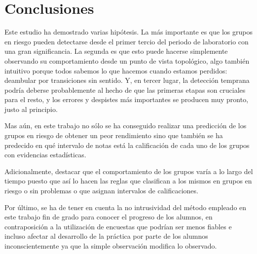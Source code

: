 \chapter{Conclusiones}\label{sec:chapterXIV}

Este estudio ha demostrado varias hipótesis. La más importante es que los grupos en riesgo pueden detectarse desde el primer tercio del periodo de laboratorio con una gran significancia. La segunda es que esto puede hacerse simplemente observando su comportamiento desde un punto de vista topológico, algo también intuitivo porque todos sabemos lo que hacemos cuando estamos perdidos: deambular por transiciones sin sentido. Y, en tercer lugar, la detección temprana podría deberse probablemente al hecho de que las primeras etapas son cruciales para el resto, y los errores y despistes más importantes se producen muy pronto, justo al principio.

Mas aún, en este trabajo no sólo se ha conseguido realizar una predicción de los grupos en riesgo de obtener un peor rendimiento sino que también se ha predecido en qué intervalo de notas está la calificación de cada uno de los grupos con evidencias estadísticas.

Adicionalmente, destacar que el comportamiento de los grupos varía a lo largo del tiempo puesto que así lo hacen las reglas que clasifican a los mismos en grupos en riesgo o sin problemas o que asignan intervalos de calificaciones.

Por último, se ha de tener en cuenta la no intrusividad del método empleado en este trabajo fin de grado para conocer el progreso de los alumnos, en contraposición a la utilización de encuestas que podrían ser menos fiables e incluso afectar al desarrollo de la práctica por parte de los alumnos inconscientemente ya que la simple observación modifica lo observado.